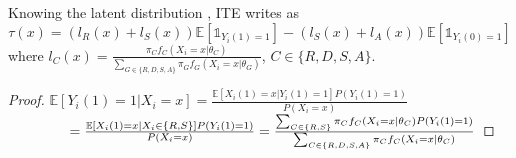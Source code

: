 \begin{proposition}\label{prop:ITE}
Knowing the latent distribution %
, ITE writes as
\begin{equation}
    \label{eq:ITE}
    \tau(x) = (l_R(x)+l_S(x)) \mathbb{E}[\mathds{1}_{Y_i(1)=1}]
	  - (l_S(x)+l_A(x))
	  \mathbb{E}[\mathds{1}_{Y_i(0)=1}]
\end{equation}
where $l_C(x)= \frac{\pi_C f_C(X_i=x|\theta_C)}{\sum_{G\in \{R,D,S,A\}} \pi_G f_G(X_i=x|\theta_G)}$, $C \in \{R,D,S,A\}$.
\end{proposition}
\begin{proof} 
$\mathbb{E}[Y_i(1)=1|X_i=x] = \frac{\mathbb{E}[X_i(1)=x|Y_i(1)=1]P(Y_i(1)=1)}{P(X_i=x)}$ \\ $ \textcolor{white}{.} \hspace{38pt}
= \frac{\mathbb{E}[X_i(1)=x|X_i \in \{R,S\}]P(Y_i(1)=1)}{P(X_i=x)}
= \frac{\sum_{C \in \{R,S\}} \pi_C f_C(X_i=x|\theta_C) P(Y_i(1)=1)}{\sum_{C \in \{R,D,S,A\}}\pi_C f_C(X_i=x|\theta_C)}$
\end{proof}








